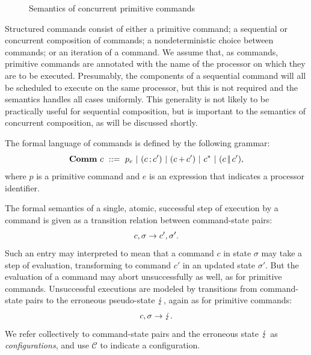 \documentclass[11pt]{report}         %
\begin{document}
\begin{figure}[p]
\begin{minipage}{\columnwidth}
            \vspace{1em}

            
            \vspace{1em}

      \end{minipage}
      \caption{\label{fig:primitive-semantics} Semantics of concurrent primitive commands}
\end{figure}

Structured commands consist of either a primitive command; a sequential or concurrent composition of commands; a nondeterministic choice between commands; or an iteration of a command. We assume that, as commands, primitive commands are annotated with the name of the processor on which they are to be executed. Presumably, the components of a sequential command will all be scheduled to execute on the same processor, but this is not required and the semantics handles all cases uniformly. This generality is not likely to be practically useful for sequential composition, but is important to the semantics of concurrent composition, as will be discussed shortly. 

The formal language of commands is defined by the following grammar: \[ \mathbf{Comm}~c ~::=~ p_e ~|~ (c \operatorname{;} c') ~|~ (c \operatorname{+} c') ~|~ c^{\operatorname{\ast}} ~|~ (c \operatorname{|\!|} c'),\] where $p$ is a primitive command and $e$ is an expression that indicates a processor identifier.  

The formal semantics of a single, atomic, successful step of execution by a command is given as a transition relation between command-state pairs: \[ c,\sigma \rightarrow c',\sigma'.\] Such an entry may interpreted to mean that a command $c$ in state $\sigma$ may take a step of evaluation, transforming to command $c'$ in an updated state $\sigma'$. But the evaluation of a command may abort unsuccessfully as well, as for primitive commands. Unsuccessful executions are modeled by transitions from command-state pairs to the erroneous pseudo-state $\lightning$, again as for primitive commands: \[ c,\sigma \rightarrow \lightning. \] We refer collectively to command-state pairs and the erroneous state $\lightning$ as \emph{configurations}, and use $\mathcal{C}$ to indicate a configuration. 
\end{document}
